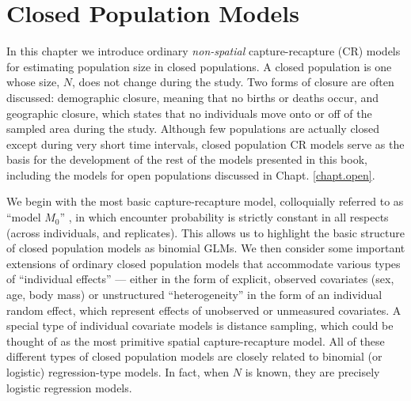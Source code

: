 \chapter{
 Closed Population Models
}
\label{chapt.closed}

\vspace{.3in}

In this chapter we introduce ordinary {\it non-spatial}
capture-recapture (CR) models for estimating population size in closed
populations. A closed population is one whose size, $N$, does not
change during the study. Two forms of closure are often discussed:
demographic closure, meaning that no births or deaths occur, and
geographic closure, which states that no individuals move onto or off
of the sampled area during the study.  Although few populations are actually
closed except during very short time intervals, closed population
CR models serve as the basis for the development of the rest of the
models presented in this book, including the models for open
populations discussed in Chapt. \ref{chapt.open}.

We begin with the most basic
capture-recapture model, colloquially referred to as ``model $M_0$''
\citep{otis_etal:1978}, in which encounter probability is strictly
constant in all respects (across individuals, and replicates).  This
allows us to highlight the basic structure of closed population models
as binomial GLMs.  We then consider some important extensions of
ordinary closed population models that accommodate various types of
``individual effects'' --- either in the form of explicit, observed
covariates (sex, age, body mass) or unstructured ``heterogeneity'' in
the form of an individual random effect, which represent effects of
unobserved or unmeasured covariates.  A special type of individual
covariate models is distance sampling, which could be thought of as
the most primitive spatial capture-recapture model.  All of these
different types of closed population models are closely related to
binomial (or logistic) regression-type models. In fact, when $N$ is
known, they are precisely logistic regression models.


